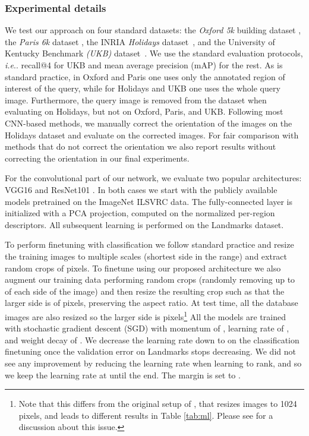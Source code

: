 \documentclass[twocolumn]{svjour3}          \smartqed  \usepackage{graphicx}
\makeatletter
\DeclareRobustCommand\onedot{\futurelet\@let@token\@onedot}
\def\@onedot{\ifx\@let@token.\else.\null\fi\xspace}
\def\ie{\emph{i.e}\onedot} \def\Ie{\emph{I.e}\onedot}
\makeatother
\begin{document}
\subsubsection{Experimental details}
We test our approach on four standard datasets: the \textit{Oxford 5k} building dataset \citep{Philbin2007}, the \textit{Paris 6k} dataset
\citep{Philbin2008}, the INRIA \textit{Holidays} dataset~\citep{Jegou2008}, and the University of Kentucky Benchmark \textit{(UKB)} dataset~\citep{Nister2006}.
We use the standard evaluation protocols, \ie recall@4 for UKB and mean average precision (mAP) for the rest.
As is standard practice, in Oxford and Paris one uses only the annotated region of interest of the query, while for Holidays and UKB one uses the whole query image.
Furthermore, the query image is removed from the dataset when evaluating on Holidays, but not on Oxford, Paris, and UKB.
Following most CNN-based methods, we manually correct the orientation of the images on the Holidays dataset and evaluate on the corrected images.
For fair comparison with methods that do not correct the orientation we also report results without correcting the orientation in our final experiments.
 
For the convolutional part of our network, we evaluate two popular architectures: VGG16  \citep{Simonyan2015verydeep} and ResNet101 \citep{He2016}. In both cases we start with the publicly available models pretrained on the ImageNet ILSVRC data. The fully-connected layer is initialized with a PCA projection, computed on the normalized per-region descriptors. 
All subsequent learning is performed on the Landmarks dataset.

To perform finetuning with classification we follow standard practice and resize the training images to multiple scales (shortest side in the  range) and extract random crops of  pixels.
To finetune using our proposed architecture we also augment our training data performing random crops (randomly removing up to  of each side of the image) and then resize the resulting crop such as that the larger side is of  pixels, preserving the aspect ratio. At test time, all the database images are also resized so the larger side is  pixels\footnote{Note that this differs from the original setup of \cite{Tolias2016}, that resizes images to 1024 pixels, and leads to different results in Table \ref{tab:ml}. Please see \cite{gordo2016deep} for a discussion about this issue.}
All the models are trained with stochastic gradient descent (SGD)  with momentum of , learning rate of , and weight decay of . We decrease the learning rate down to  on the classification finetuning once the validation error on Landmarks stops decreasing. We did not see any improvement by reducing the learning rate when learning to rank, and so we keep the learning rate at  until the end. 
The margin is set to . 
\end{document}
